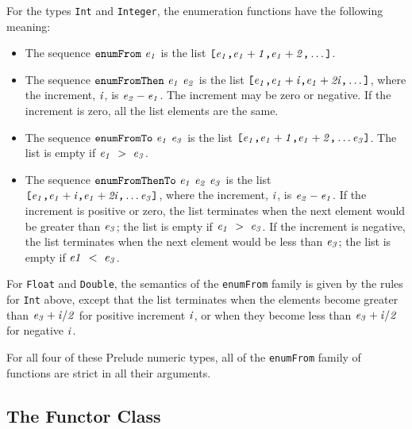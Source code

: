 For the types \mbox{\tt Int} and \mbox{\tt Integer}, the enumeration functions 
have the following meaning:
\begin{itemize}
\item The sequence \mbox{$\it \makebox{\tt enumFrom}~e_1$} is the list \mbox{$\it \makebox{\tt [}e_1\makebox{\tt ,}e_1+1\makebox{\tt ,}e_1+2\makebox{\tt ,}\ldots \makebox{\tt ]}$}.

\item The sequence \mbox{$\it \makebox{\tt enumFromThen}~e_1~e_2$} is the list \mbox{$\it \makebox{\tt [}e_1\makebox{\tt ,}e_1+i\makebox{\tt ,}e_1+2i\makebox{\tt ,}\ldots \makebox{\tt ]}$},
where the increment, \mbox{$\it i$}, is \mbox{$\it e_2-e_1$}.  The increment may be zero or negative.
If the increment is zero, all the list elements are the same.

\item The sequence \mbox{$\it \makebox{\tt enumFromTo}~e_1~e_3$} is 
the list \mbox{$\it \makebox{\tt [}e_1\makebox{\tt ,}e_1+1\makebox{\tt ,}e_1+2\makebox{\tt ,}\ldots e_3\makebox{\tt ]}$}.
The list is empty if \mbox{$\it e_1\ >\ e_3$}.

\item The sequence \mbox{$\it \makebox{\tt enumFromThenTo}~e_1~e_2~e_3$} 
is the list \mbox{$\it \makebox{\tt [}e_1\makebox{\tt ,}e_1+i\makebox{\tt ,}e_1+2i\makebox{\tt ,}\ldots e_3\makebox{\tt ]}$},
where the increment, \mbox{$\it i$}, is \mbox{$\it e_2-e_1$}.  If the increment 
is positive or zero, the list terminates when the next element would
be greater than \mbox{$\it e_3$}; the list is empty if \mbox{$\it e_1\ >\ e_3$}.
If the increment is negative, the list terminates when the next element would
be less than \mbox{$\it e_3$}; the list is empty if \mbox{$\it e1\ <\ e_3$}.
\end{itemize}
For \mbox{\tt Float} and \mbox{\tt Double}, the semantics of the \mbox{\tt enumFrom} family is
given by the rules for \mbox{\tt Int} above, except that the list terminates
when the elements become greater than \mbox{$\it e_3+i/2$} for positive increment
\mbox{$\it i$}, or when they become less than \mbox{$\it e_3+i/2$} for negative \mbox{$\it i$}.

For all four of these Prelude numeric types, all of the \mbox{\tt enumFrom} 
family of functions are strict in all their arguments.

\subsection{The Functor Class}

